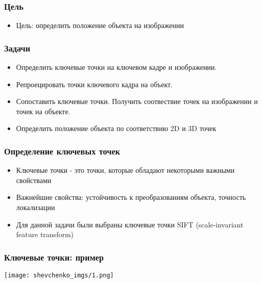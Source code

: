 \begin{frame}\frametitle{Цель}
    \begin{itemize}
        \item Цель: определить положение объекта на изображении
    \end{itemize}
\end{frame}
\begin{frame}\frametitle{Задачи}
    \begin{itemize}
        \item Определить ключевые точки на ключевом кадре и изображении.
        \item Репроецировать точки ключевого кадра на объект.
        \item Сопоставить ключевые точки. Получить соотвествие 
            точек на изображении и точек на объекте.
        \item Определить положение объекта по соответствию 2D и 3D точек
    \end{itemize}
\end{frame}
\begin{frame}\frametitle{Определение ключевых точек}
    \begin{itemize}
        \item Ключевые точки - это точки, которые обладают некоторыми важными свойствами
        \item Важнейшие свойства: устойчивость к преобразованиям объекта, 
            точность локализации
        \item Для данной задачи были выбраны ключевые точки SIFT 
            (scale-invariant feature transform)
    \end{itemize}
\end{frame}
\begin{frame}\frametitle{Ключевые точки: пример}
    \begin{center}
        \texttt{[image: shevchenko\_imgs/1.png]}
    \end{center}
\end{frame}

